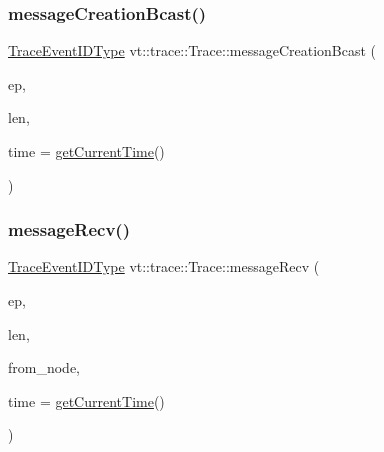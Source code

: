 \mbox{\label{structvt_1_1trace_1_1_trace_ad034b14649101fb530eccfb4e2b958ce}} 
\subsubsection{\texorpdfstring{message\+Creation\+Bcast()}{messageCreationBcast()}}
{\footnotesize\ttfamily \hyperlink{namespacevt_1_1trace_a64a7185f3e102df8d8258f263ccd1582}{Trace\+Event\+I\+D\+Type} vt\+::trace\+::\+Trace\+::message\+Creation\+Bcast (\begin{DoxyParamCaption}\item[{\hyperlink{namespacevt_1_1trace_a3c14050715ba9eceaeff51fb3de64f2f}{Trace\+Entry\+I\+D\+Type} const}]{ep,  }\item[{\hyperlink{namespacevt_1_1trace_aeb598f45d67d41db7902e494f2f0ce59}{Trace\+Msg\+Len\+Type} const}]{len,  }\item[{double const}]{time = {\ttfamily \hyperlink{structvt_1_1trace_1_1_trace_a04cf6b76b4ced1bc90d246a34c948db5}{get\+Current\+Time}()} }\end{DoxyParamCaption})}

\mbox{\label{structvt_1_1trace_1_1_trace_aa14d58fb03a226e213f72bb03a13bb9f}} 
\subsubsection{\texorpdfstring{message\+Recv()}{messageRecv()}}
{\footnotesize\ttfamily \hyperlink{namespacevt_1_1trace_a64a7185f3e102df8d8258f263ccd1582}{Trace\+Event\+I\+D\+Type} vt\+::trace\+::\+Trace\+::message\+Recv (\begin{DoxyParamCaption}\item[{\hyperlink{namespacevt_1_1trace_a3c14050715ba9eceaeff51fb3de64f2f}{Trace\+Entry\+I\+D\+Type} const}]{ep,  }\item[{\hyperlink{namespacevt_1_1trace_aeb598f45d67d41db7902e494f2f0ce59}{Trace\+Msg\+Len\+Type} const}]{len,  }\item[{\hyperlink{namespacevt_a866da9d0efc19c0a1ce79e9e492f47e2}{Node\+Type} const}]{from\+\_\+node,  }\item[{double const}]{time = {\ttfamily \hyperlink{structvt_1_1trace_1_1_trace_a04cf6b76b4ced1bc90d246a34c948db5}{get\+Current\+Time}()} }\end{DoxyParamCaption})}

